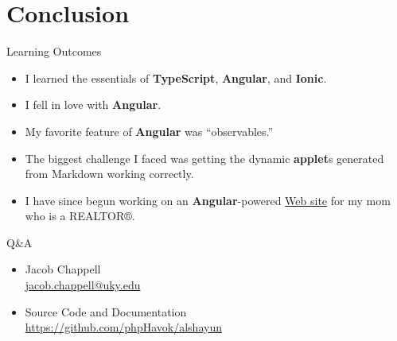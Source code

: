 \documentclass{beamer}
\begin{document}
\section{Conclusion}

\begin{frame}{Learning Outcomes}
    \begin{itemize}
        \item I learned the essentials of \textbf{TypeScript}, \textbf{Angular},
            and \textbf{Ionic}.
        \item I fell in love with \textbf{Angular}.
        \item My favorite feature of \textbf{Angular} was ``observables.''
        \item The biggest challenge I faced was getting  the dynamic
            \textbf{applet}s generated from Markdown working correctly.
        \item I have since begun working on an \textbf{Angular}-powered
            \href{https://kristinickells.com}{Web site} for my mom who is a
            REALTOR®.
    \end{itemize}
\end{frame}

\begin{frame}{Q\&A}
    \begin{itemize}
        \item \begin{center}
                Jacob Chappell \\
                \href{mailto:jacob.chappell@uky.edu}{jacob.chappell@uky.edu}
                \vfill
        \end{center}
        \item \begin{center}
                Source Code and Documentation \\ \url{https://github.com/phpHavok/alshayun}
        \end{center}
    \end{itemize}
\end{frame}
\end{document}
